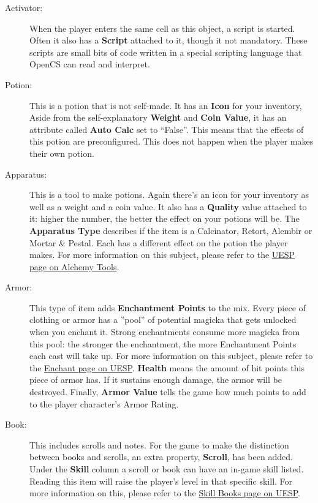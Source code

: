 \begin{description}
 \item[Activator:] When the player enters the same cell as this object, a script is started. Often it also has a \textbf{Script} attached to it, though it not mandatory. These scripts are small bits of code written in a special scripting language that OpenCS can read and interpret.
 \item[Potion:] This is a potion that is not self-made. It has an \textbf{Icon} for your inventory, Aside from the self-explanatory \textbf{Weight} and \textbf{Coin Value}, it has an attribute called \textbf{Auto Calc} set to ``False''. This means that the effects of this potion are preconfigured. This does not happen when the player makes their own potion.
 \item[Apparatus:] This is a tool to make potions. Again there's an icon for your inventory as well as a weight and a coin value. It also has a \textbf{Quality} value attached to it: higher the number, the better the effect on your potions will be. The \textbf{Apparatus Type} describes if the item is a Calcinator, Retort, Alembir or Mortar & Pestal. Each has a different effect on the potion the player makes. For more information on this subject, please refer to the \href{http://www.uesp.net/wiki/Morrowind:Alchemy#Tools}{UESP page on Alchemy Tools}.
 \item[Armor:] This type of item adds \textbf{Enchantment Points} to the mix. Every piece of clothing or armor has a ''pool'' of potential magicka that gets unlocked when you enchant it. Strong enchantments consume more magicka from this pool: the stronger the enchantment, the more Enchantment Points each cast will take up. For more information on this subject, please refer to the \href{http://www.uesp.net/wiki/Morrowind:Enchant}{Enchant page on UESP}. \textbf{Health} means the amount of hit points this piece of armor has. If it sustains enough damage, the armor will be destroyed. Finally, \textbf{Armor Value} tells the game how much points to add to the player character's Armor Rating.
 \item[Book:] This includes scrolls and notes. For the game to make the distinction between books and scrolls, an extra property, \textbf{Scroll}, has been added. Under the \textbf{Skill} column a scroll or book can have an in-game skill listed. Reading this item will raise the player's level in that specific skill. For more information on this, please refer to the \href{http://www.uesp.net/wiki/Morrowind:Skill_Books}{Skill Books page on UESP}.

\end{description}
